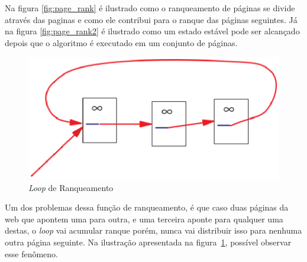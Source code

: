 Na figura \ref{fig:page_rank} é ilustrado como o ranqueamento de páginas se divide através das paginas e como ele contribui para o ranque das páginas seguintes. Já na figura \ref{fig:page_rank2} é ilustrado como um estado estável pode ser alcançado depois que o algoritmo é executado em um conjunto de páginas. 

\begin{figure}[!h]
    \centering
        \includegraphics[keepaspectratio=true,scale=0.5]{figuras/page_rank3.eps}
    \caption{\textit{Loop} de Ranqueamento}
    \label{fig:page_rank3}
\end{figure}

Um dos problemas dessa função de ranqueamento, é que caso duas páginas da web que apontem uma para outra, e uma terceira aponte para qualquer uma destas, o \textit{loop} vai acumular ranque porém, nunca vai distribuir isso para nenhuma outra página seguinte. Na ilustração apresentada na figura~\ref{fig:page_rank3}, possível observar esse fenômeno.
